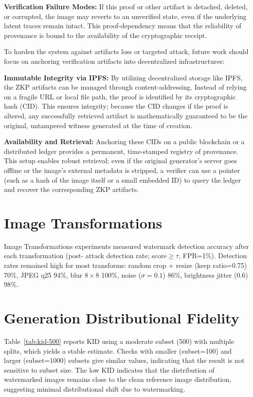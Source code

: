 \documentclass{article}
\theoremstyle{plain}
\theoremstyle{definition}
\theoremstyle{remark}
\begin{document}
\textbf{Verification Failure Modes:} If this proof or other artifact is detached, deleted, or corrupted, the image may reverts to an unverified state, even if the underlying latent traces remain intact. This proof-dependency means that the reliability of provenance is bound to the availability of the cryptographic receipt.

To harden the system against artifacts loss or targeted attack, future work should focus on anchoring verification artifacts into decentralized infrastructures:

\textbf{Immutable Integrity via IPFS:} By utilizing decentralized storage like IPFS, the ZKP artifacts can be managed through content-addressing. Instead of relying on a fragile URL or local file path, the proof is identified by its cryptographic hash (CID). This ensures integrity; because the CID changes if the proof is altered, any successfully retrieved artifact is mathematically guaranteed to be the original, untampered witness generated at the time of creation. 

\textbf{Availability and Retrieval:} Anchoring these CIDs on a public blockchain or a distributed ledger provides a permanent, time-stamped registry of provenance. This setup enables robust retrieval; even if the original generator’s server goes offline or the image's external metadata is stripped, a verifier can use a pointer (such as a hash of the image itself or a small embedded ID) to query the ledger and recover the corresponding ZKP artifacts. 

\section{Image Transformations} \label{Image Transformations}
  Image Transformations experiments measured watermark detection accuracy after each transformation (post-
  attack detection rate; score$\geq\tau$, FPR=1\%). Detection rates remained high for most transforms:
  random crop + resize (keep ratio=0.75) 70\%, JPEG q25 94\%, blur $8\times 8$ 100\%, noise ($\sigma=0.1$)
  86\%, brightness jitter (0.6) 98\%. 

\section{Generation Distributional Fidelity}\label{Generation Distributional Fidelity}
Table~\ref{tab:kid-500} reports KID \cite{binkowski2018mmdgan} using a moderate subset (500) with multiple splits, which yields a stable estimate. Checks with smaller (subset=100) and larger (subset=1000) subsets give similar values, indicating that the result is not sensitive to subset size. The low KID indicates that the distribution of watermarked images remains close to the clean reference image distribution, suggesting minimal distributional shift due to watermarking.
\end{document}
